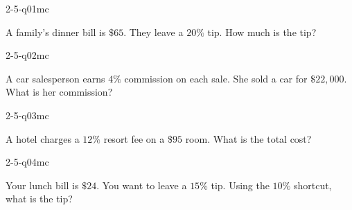 

\begin{practiceQuestion}{2-5-q01}{mc}
\begin{questionText}
A family's dinner bill is $\$65$. They leave a $20\%$ tip. How much is the tip?
\end{questionText}
\end{practiceQuestion}

\begin{practiceQuestion}{2-5-q02}{mc}
\begin{questionText}
A car salesperson earns $4\%$ commission on each sale. She sold a car for $\$22{,}000$. What is her commission?
\end{questionText}
\end{practiceQuestion}

\begin{practiceQuestion}{2-5-q03}{mc}
\begin{questionText}
A hotel charges a $12\%$ resort fee on a $\$95$ room. What is the total cost?
\end{questionText}
\end{practiceQuestion}

\begin{practiceQuestion}{2-5-q04}{mc}
\begin{questionText}
Your lunch bill is $\$24$. You want to leave a $15\%$ tip. Using the $10\%$ shortcut, what is the tip?
\end{questionText}
\end{practiceQuestion}

